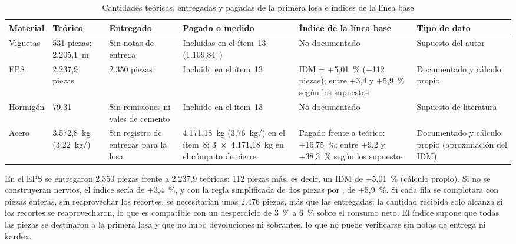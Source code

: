 \begin{table}[H]
\caption{Cantidades teóricas, entregadas y pagadas de la primera losa e índices de la línea base}
\label{tab:linea-base}
\setlength{\tabcolsep}{3.5pt}
\begin{tabularx}{\linewidth}{@{}P{1.9cm}P{2.3cm}P{2.3cm}P{2.9cm}LP{2.6cm}@{}}
\toprule
\textbf{Material} & \textbf{Teórico} & \textbf{Entregado} & \textbf{Pagado o medido} & \textbf{Índice de la línea base} & \textbf{Tipo de dato} \\
\midrule
Viguetas & 531 piezas; 2.205,1~m & Sin notas de entrega & Incluidas en el ítem~13 (1.109,84~\mdos{}) & No documentado & Supuesto del autor \\
EPS & 2.237,9 piezas & 2.350 piezas & Incluido en el ítem~13 & IDM = +5,01~\% (+112 piezas); entre +3,4 y +5,9~\% según los supuestos & Documentado y cálculo propio \\
Hormigón & 79,31~\mtres{} & Sin remisiones ni vales de cemento & Incluido en el ítem~13 & No documentado & Supuesto de literatura \\
Acero & 3.572,8~kg (3,22~kg/\mdos{}) & Sin registro de entregas para la losa & 4.171,18~kg (3,76~kg/\mdos{}) en el ítem~8; 3~$\times$~4.171,18~kg en el cómputo de cierre & Pagado frente a teórico: +16,75~\%; entre +9,2 y +38,3~\% según los supuestos & Documentado y cálculo propio (aproximación del IDM) \\
\bottomrule
\end{tabularx}
\end{table}

En el EPS se entregaron 2.350 piezas frente a 2.237,9 teóricas: 112 piezas más, es decir, un IDM de +5,01~\% (cálculo propio). Si no se construyeran nervios, el índice sería de +3,4~\%, y con la regla simplificada de dos piezas por \mdos{}, de +5,9~\%. Si cada fila se completara con piezas enteras, sin reaprovechar los recortes, se necesitarían unas 2.476 piezas, más que las entregadas; la cantidad recibida solo alcanza si los recortes se reaprovecharon, lo que es compatible con un desperdicio de 3~\% a 6~\% sobre el consumo neto. El índice supone que todas las piezas se destinaron a la primera losa y que no hubo devoluciones ni sobrantes, lo que no puede verificarse sin notas de entrega ni kardex.

